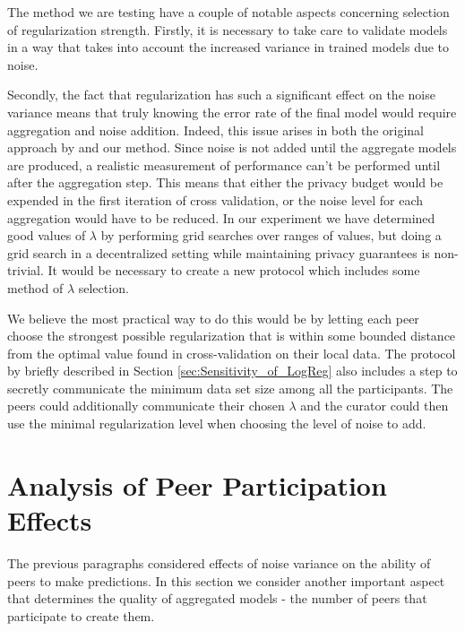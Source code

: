 The method we are testing have a couple of notable aspects concerning selection of regularization strength. Firstly, it is necessary to take care to validate models in a way that takes into account the increased variance in trained models due to noise.

Secondly, the fact that regularization has such a significant effect on the noise variance means that truly knowing the error rate of the final model would require aggregation and noise addition. Indeed, this issue arises in both the original approach by \cite{pathak2010diffprivhomo} and our method. Since noise is not added until the aggregate models are produced, a realistic measurement of performance can't be performed until after the aggregation step. This means that either the privacy budget would be expended in the first iteration of cross validation, or the noise level for each aggregation would have to be reduced. In our experiment we have determined good values of $\lambda$ by performing grid searches over ranges of values, but doing a grid search in a decentralized setting while maintaining privacy guarantees is non-trivial. It would be necessary to create a new protocol which includes some method of $\lambda$ selection. 

We believe the most practical way to do this would be by letting each peer choose the strongest possible regularization that is within some bounded distance from the optimal value found in cross-validation on their local data. The protocol by \cite{pathak2010diffprivhomo} briefly described in Section \ref{sec:Sensitivity_of_LogReg} also includes a step to secretly communicate the minimum data set size among all the participants. The peers could additionally communicate their chosen $\lambda$ and the curator could then use the minimal regularization level when choosing the level of noise to add.

\section{Analysis of Peer Participation Effects}
\label{sec:aggregation_effects}

The previous paragraphs considered effects of noise variance on the ability of peers to make predictions. In this section we consider another important aspect that determines the quality of aggregated models - the number of peers that participate to create them. 

